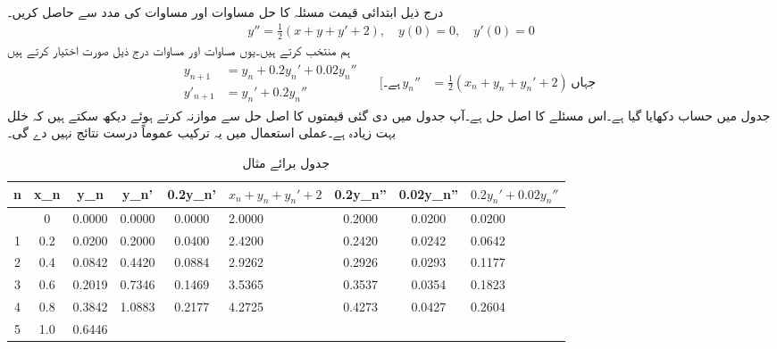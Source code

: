 \quad {}\\
درج ذیل ابتدائی قیمت مسئلہ کا حل مساوات  اور مساوات  کی مدد سے حاصل کریں۔
\begin{align*}
y''=\tfrac{1}{2}(x+y+y'+2),\quad y(0)=0,\quad y'(0)=0
\end{align*}
ہم  منتخب کرتے ہیں۔یوں مساوات  اور مساوات  درج ذیل صورت اختیار کرتے ہیں
\begin{gather*}
\begin{aligned}
y_{n+1}&=y_n+0.2y_n'+0.02y_n''\\
y'_{n+1}&=y_n'+0.2y_n''
\end{aligned}\quad
\begin{aligned}
[\text{ہے۔}\, y_n''&=\tfrac{1}{2}(x_n+y_n+y_n'+2) \, \text{جہاں}\
\end{aligned}
\end{gather*}
جدول  میں حساب دکھایا گیا ہے۔اس مسئلے کا اصل حل  ہے۔آپ جدول میں دی گئی قیمتوں کا اصل حل سے موازنہ کرتے ہوئے  دیکھ سکتے ہیں کہ خلل بہت زیادہ ہے۔عملی استعمال میں یہ ترکیب عموماً  درست نتائج نہیں دے گی۔
\begin{table}
\caption{جدول برائے مثال }
\label{جدول_مثال_اعدادی_دو_درجی_سادہ_الف}
\centering
\begin{tabular}{|C|C|C|C|C|p{15mm}|C|C|p{10mm}|}
\hline
n&x_n&y_n&y_n'&0.2y_n'&$x_n+y_n+y_n'+2$&0.2y_n''&0.02y_n''&$0.2y_n'+0.02y_n''$\\
\hline{}&0&0.0000&0.0000&0.0000&2.0000&0.2000&0.0200&0.0200\\
1&0.2&0.0200&0.2000&0.0400&2.4200&0.2420&0.0242&0.0642\\
2&0.4&0.0842&0.4420&0.0884&2.9262&0.2926&0.0293&0.1177\\
3&0.6&0.2019&0.7346&0.1469&3.5365&0.3537&0.0354&0.1823\\
4&0.8&0.3842&1.0883&0.2177&4.2725&0.4273&0.0427&0.2604\\
5&1.0&0.6446&&&&&&\\
\hline
\end{tabular}
\end{table}

